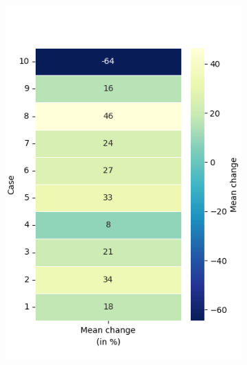 \begin{figure}[h!]
\begin{subfigure}[t]{0.32\textwidth}
		\includegraphics[width=\textwidth]{Figures/TP_mean_heatmap_percentage.png}
		\label{fig: TP_mean}
		\caption{}
	\end{subfigure}
	\hfill
	\begin{subfigure}[t]{0.32\textwidth}
		\centering

\end{subfigure}
\end{figure}
